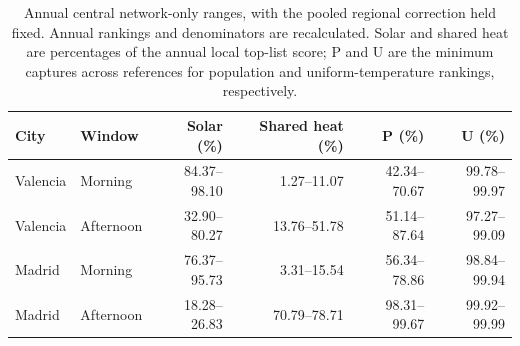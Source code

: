 \begin{table}[htbp]\centering\small
\caption{Annual central network-only ranges, with the pooled regional correction held fixed. Annual rankings and denominators are recalculated. Solar and shared heat are percentages of the annual local top-list score; P and U are the minimum captures across references for population and uniform-temperature rankings, respectively.}\label{tab:annual_mechanisms}
\begin{tabular}{llrrrr}\toprule City & Window & Solar (\%) & Shared heat (\%) & P (\%) & U (\%)\\\midrule
Valencia & Morning & 84.37--98.10 & 1.27--11.07 & 42.34--70.67 & 99.78--99.97\\
Valencia & Afternoon & 32.90--80.27 & 13.76--51.78 & 51.14--87.64 & 97.27--99.09\\
Madrid & Morning & 76.37--95.73 & 3.31--15.54 & 56.34--78.86 & 98.84--99.94\\
Madrid & Afternoon & 18.28--26.83 & 70.79--78.71 & 98.31--99.67 & 99.92--99.99\\
\bottomrule\end{tabular}\end{table}